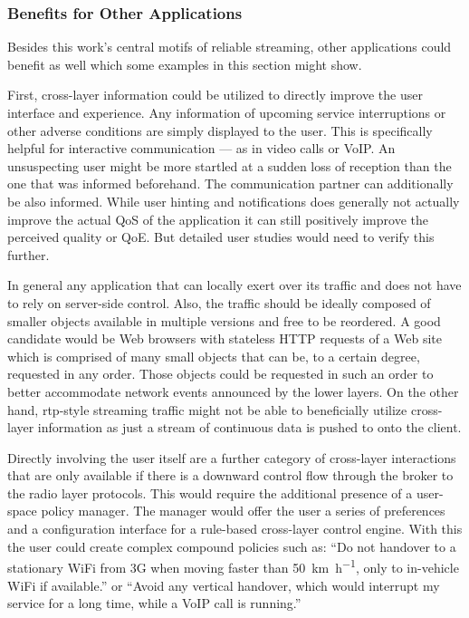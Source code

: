 \subsubsection{Benefits for Other Applications}

Besides this work's central motifs of reliable streaming, other applications could benefit as well which some examples in this section might show.

First, cross-layer information could be utilized to directly improve the user interface and experience. Any information of upcoming service interruptions or other adverse conditions are simply displayed to the user. This is specifically helpful for interactive communication --- as in video calls or \gls{VoIP}. An unsuspecting user might be more startled at a sudden loss of reception than the one that was informed beforehand. The communication partner can additionally be also informed. While user hinting and notifications does generally not actually improve the actual \gls{QoS} of the application it can still positively improve the perceived quality or \gls{QoE}. But detailed user studies would need to verify this further.

In general any application that can locally exert over its traffic and does not have to rely on server-side control. Also, the traffic should be ideally composed of smaller objects available in multiple versions and free to be reordered. A good candidate would be Web browsers with stateless \gls{HTTP} requests of a Web site which is comprised of many small objects that can be, to a certain degree, requested in any order. Those objects could be requested in such an order to better accommodate network events announced by the lower layers. On the other hand, \gls{rtp}-style streaming traffic might not be able to beneficially utilize cross-layer information as just a stream of continuous data is pushed to onto the client.

Directly involving the user itself are a further category of cross-layer interactions that are only available if there is a downward control flow through the broker to the radio layer protocols. This would require the additional presence of a user-space policy manager. The manager would offer the user a series of preferences and a configuration interface for a rule-based cross-layer control engine. With this the user could create complex compound policies such as: ``Do not handover to a stationary WiFi from \gls{3G} when moving faster than \SI{50}{\kilo\meter\per\hour}, only to in-vehicle WiFi if available.'' or ``Avoid any vertical handover, which would interrupt my service for a long time, while a VoIP call is running.''



